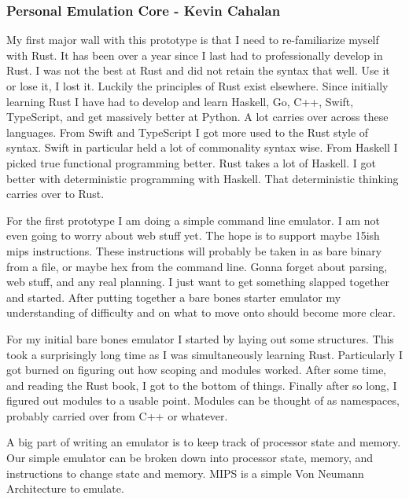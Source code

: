 \documentclass[
    paper=letter,
    parskip=half,
    fontsize=12pt,
    titlepage=firstiscover,
    toc=bibliography,
    numbers=endperiod
]{scrartcl}
\begin{document}
\subsubsection{Personal Emulation Core - Kevin Cahalan}

My first major wall with this prototype is that I need to re-familiarize
myself with Rust. It has been over a year since I last had to
professionally develop in Rust. I was not the best at Rust and did not
retain the syntax that well. Use it or lose it, I lost it. Luckily the
principles of Rust exist elsewhere. Since initially learning Rust I have
had to develop and learn Haskell, Go, C++, Swift, TypeScript, and get
massively better at Python. A lot carries over across these languages.
From Swift and TypeScript I got more used to the Rust style of syntax.
Swift in particular held a lot of commonality syntax wise. From Haskell
I picked true functional programming better. Rust takes a lot of
Haskell. I got better with deterministic programming with Haskell. That
deterministic thinking carries over to Rust.

For the first prototype I am doing a simple command line emulator. I am
not even going to worry about web stuff yet. The hope is to support
maybe 15ish mips instructions. These instructions will probably be taken
in as bare binary from a file, or maybe hex from the command line. Gonna
forget about parsing, web stuff, and any real planning. I just want to
get something slapped together and started. After putting together a
bare bones starter emulator my understanding of difficulty and on what
to move onto should become more clear.

For my initial bare bones emulator I started by laying out some
structures. This took a surprisingly long time as I was simultaneously
learning Rust. Particularly I got burned on figuring out how scoping and
modules worked. After some time, and reading the Rust book, I got to the
bottom of things. Finally after so long, I figured out modules to a
usable point. Modules can be thought of as namespaces, probably carried
over from C++ or whatever.

A big part of writing an emulator is to keep track of processor state
and memory. Our simple emulator can be broken down into processor state,
memory, and instructions to change state and memory. MIPS is a simple
Von Neumann Architecture to emulate.
\end{document}

